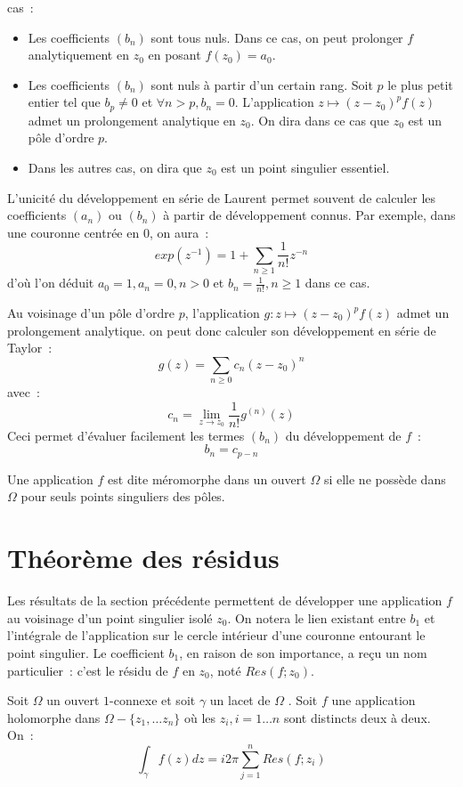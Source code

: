 cas~:
\begin{itemize}
  \item Les coefficients $(b_n)$ sont tous nuls. Dans ce cas, on peut prolonger
  $f$ analytiquement en $z_0$ en posant $f(z_0)=a_0$. 
  \item Les coefficients $(b_n)$ sont nuls à partir d'un certain rang. Soit $p$
  le plus petit entier tel que $b_p \neq 0$ et $\forall n > p, b_n = 0$.
  L'application $z \mapsto (z-z_0)^p f(z)$ admet un prolongement analytique en
  $z_0$. On dira dans ce cas que $z_0$ est un pôle d'ordre $p$.
  \item Dans les autres cas, on dira que $z_0$ est un point singulier essentiel.
\end{itemize}
\begin{rem}
L'unicité du développement en série de Laurent permet souvent de calculer les
coefficients $(a_n)$ ou $(b_n)$ à partir de développement connus. Par exemple,
dans une couronne centrée en $0$, on aura~:
\[
exp(z^{-1}) = 1 + \sum_{n \geq 1} \frac{1}{n!} z^{-n}
\]
d'où l'on déduit $a_0=1, a_n=0 , n > 0$ et $b_n=\frac{1}{n!}, n \geq 1$ dans ce
cas.
\end{rem}
\begin{rem}
Au voisinage d'un pôle d'ordre $p$, l'application $g \colon z \mapsto (z-z_0)^p
f(z)$ admet un prolongement analytique. on peut donc calculer son développement en
série de Taylor~:
\[
g(z) = \sum_{n \geq 0} c_n (z-z_0)^n
\]
avec~:
\[
c_n = \lim_{z \to z_0} \frac{1}{n!} g^{(n)}(z)
\]
Ceci permet d'évaluer facilement les termes $(b_n)$ du développement de $f$~:
\[
b_n = c_{p-n}
\]
\begin{defn}
Une application $f$ est dite méromorphe dans un ouvert $\Omega$ si elle ne
possède dans $\Omega$ pour seuls points singuliers des pôles.
\end{defn}
\end{rem}
\section{Théorème des résidus}
Les résultats de la section précédente permettent de développer une application
$f$ au voisinage d'un point singulier isolé $z_0$. On notera le lien existant
entre $b_1$ et l'intégrale de l'application sur le cercle intérieur d'une couronne
entourant le point singulier. Le coefficient $b_1$, en raison de son importance,
a reçu un nom particulier~: c'est le résidu de $f$ en $z_0$, noté $Res(f;z_0)$.

\begin{fthm}
Soit $\Omega$ un ouvert $1$-connexe et soit 
$\gamma$ un lacet de $\Omega$ . Soit $f$ une application holomorphe dans 
$\Omega-\{z_1, \dots z_n\}$ où les $z_i,i=1\dots n$ sont distincts deux à deux.
On~:
\[
\int_{\gamma} f(z) dz = i 2 \pi \sum_{j=1}^n Res(f;z_i)
\]
\end{fthm}

